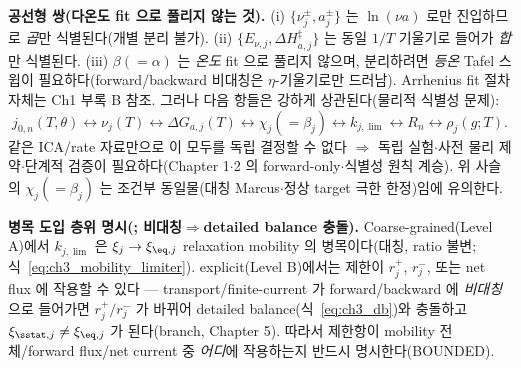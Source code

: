 \textbf{공선형 쌍(다온도 fit 으로 풀리지 않는 것).} (i) $\{\nu_j^\pm,a_j^\pm\}$ 는 $\ln(\nu a)$ 로만 진입하므로
\emph{곱}만 식별된다(개별 분리 불가). (ii) $\{E_{\nu,j},\Delta H_{a,j}^\ddagger\}$ 는 동일 $1/T$ 기울기로
들어가 \emph{합}만 식별된다. (iii) $\beta(=\alpha)$ 는 \emph{온도} fit 으로 풀리지 않으며, 분리하려면 \emph{등온}
Tafel 스윕이 필요하다(forward/backward 비대칭은 $\eta$-기울기로만 드러남). Arrhenius fit 절차 자체는 Ch1 부록 B
참조. 그러나 다음 항들은 강하게 상관된다(물리적 식별성 문제):
\begin{equation}
j_{0,n}(T,\theta)\leftrightarrow\nu_j(T)\leftrightarrow\Delta G_{a,j}(T)\leftrightarrow\chi_j(=\beta_j)\leftrightarrow k_{j,\lim}\leftrightarrow R_n\leftrightarrow\rho_j(g;T).
\label{eq:ch3_ident_chain}
\end{equation}
같은 ICA/rate 자료만으로 이 모두를 독립 결정할 수 없다 $\Rightarrow$ 독립 실험$\cdot$사전 물리 제약$\cdot$단계적
검증이 필요하다(Chapter 1$\cdot$2 의 forward-only$\cdot$식별성 원칙 계승). 위 사슬의 $\chi_j(=\beta_j)$ 는
조건부 동일물(대칭 Marcus$\cdot$정상 target 극한 한정)임에 유의한다.
\begin{boundbox}
\textbf{병목 도입 층위 명시(; 비대칭$\Rightarrow$detailed balance 충돌).} Coarse-grained(Level A)에서
$k_{j,\lim}$ 은 $\xi_j\to\xi_{\eq,j}$ relaxation mobility 의 병목이다(대칭, ratio 불변; 식~\eqref{eq:ch3_mobility_limiter}).
explicit(Level B)에서는
제한이 $r_j^+$, $r_j^-$, 또는 net flux 에 작용할 수 있다 — transport/finite-current 가 forward/backward 에
\emph{비대칭}으로 들어가면 $r_j^+/r_j^-$ 가 바뀌어 detailed balance(식~\eqref{eq:ch3_db})와 충돌하고
$\xi_{\sstat,j}\ne\xi_{\eq,j}$ 가 된다(branch, Chapter 5). 따라서 제한항이 mobility 전체/forward flux/net current
중 \emph{어디}에 작용하는지 반드시 명시한다(BOUNDED).
\end{boundbox}

